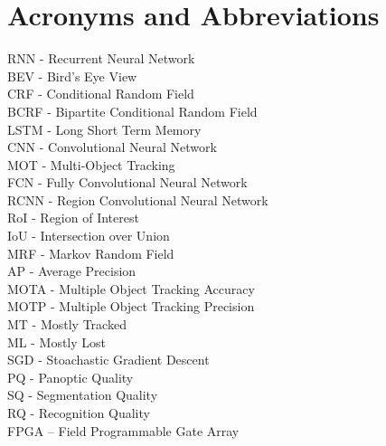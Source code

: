 \chapter*{Acronyms and Abbreviations}

\vspace{5mm}
RNN - Recurrent Neural Network \\
BEV - Bird's Eye View \\
CRF - Conditional Random Field \\
BCRF - Bipartite Conditional Random Field \\
LSTM - Long Short Term Memory \\
CNN - Convolutional Neural Network \\
MOT - Multi-Object Tracking \\
FCN - Fully Convolutional Neural Network \\
RCNN - Region Convolutional Neural Network \\
RoI - Region of Interest \\
IoU - Intersection over Union \\
MRF - Markov Random Field \\
AP - Average Precision \\
MOTA - Multiple Object Tracking Accuracy\\
MOTP - Multiple Object Tracking Precision \\
MT - Mostly Tracked \\
ML - Mostly Lost \\
SGD - Stoachastic Gradient Descent \\
PQ - Panoptic Quality \\
SQ - Segmentation Quality \\
RQ - Recognition Quality \\
FPGA – Field Programmable Gate Array \\



